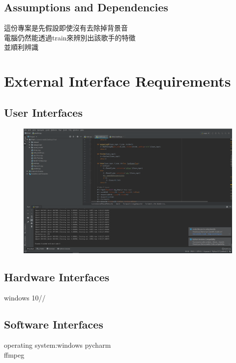 \documentclass{article}
\begin{document}
\begin{CJK}{UTF8}{bkai}
\subsection{\Large  Assumptions and Dependencies\\}
  \Large  這份專案是先假設即使沒有去除掉背景音\\
 電腦仍然能透過train來辨別出該歌手的特徵\\
並順利辨識

\newpage

\section{\huge\bf  \color{blue} External Interface Requirements\\}
\subsection{\Large User Interfaces\\}
\begin{figure}[h]
\begin{center}
\includegraphics[width=15cm]{software.png}
\end{center}
\label{fig:1}
\end{figure}
\subsection{\Large Hardware Interfaces\\}
windows 10//
\newpage
\subsection{\Large Software Interfaces\\}
operating system:windows
pycharm\\
ffmpeg


\end{CJK}
\end{document}
